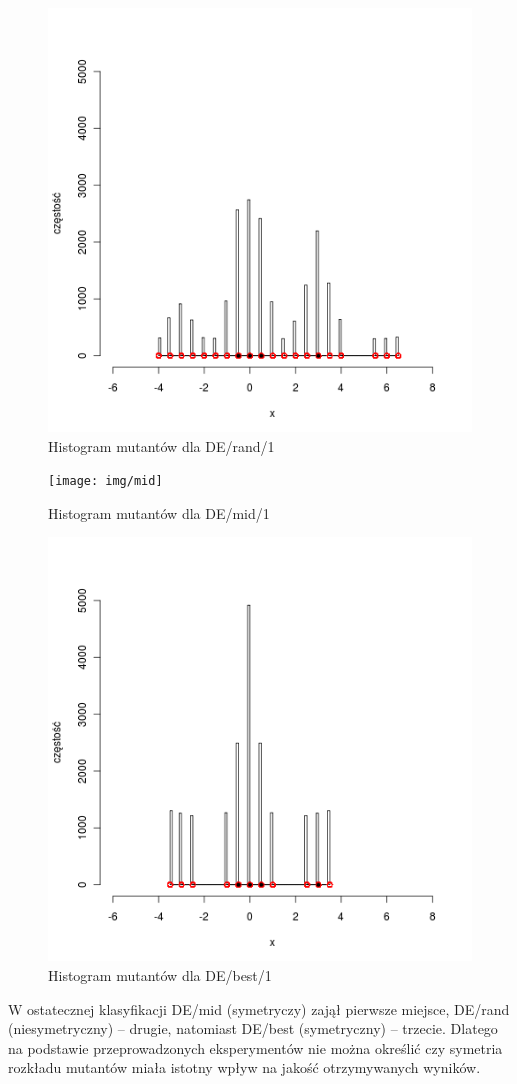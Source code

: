 \documentclass[a4paper,onecolumn,oneside,12pt,wide,floatssmall]{mwrep}
\theoremstyle{definition}
\theoremstyle{plain}%
\theoremstyle{remark}
\begin{document}
\begin{figure}[H]
\centering
\includegraphics[width=.65\textwidth]{img/rand}
\caption{Histogram mutantów dla DE/rand/1} 
\label{fig:sym_rand}
\end{figure}

\begin{figure}[H]
\centering
\texttt{[image: img/mid]}
\caption{Histogram mutantów dla DE/mid/1} 
\label{fig:sym_mid}
\end{figure}

\begin{figure}[H]
\centering
\includegraphics[width=.65\textwidth]{img/best}
\caption{Histogram mutantów dla DE/best/1} 
\label{fig:sym_best}
\end{figure}

W ostatecznej klasyfikacji DE/mid (symetryczy) zajął pierwsze miejsce, 
DE/rand (niesymetryczny) -- drugie, natomiast DE/best (symetryczny) -- trzecie.
Dlatego na podstawie przeprowadzonych eksperymentów nie można określić czy symetria rozkładu 
mutantów miała istotny wpływ na jakość otrzymywanych wyników. 
\end{document}
